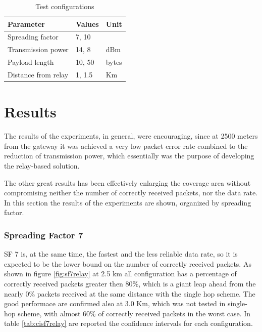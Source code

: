 \begin{table}[]
\centering
\caption{Test configurations}
\label{tab:relay_test}
\begin{tabular}{@{}lll@{}}
\toprule
Parameter           & Values & Unit  \\ \midrule
Spreading factor    & 7, 10  &       \\
Transmission power  & 14, 8  & dBm   \\
Payload length      & 10, 50 & bytes \\
Distance from relay & 1, 1.5 & Km    \\ \bottomrule
\end{tabular}
\end{table}

\section{Results}
The results of the experiments, in general, were encouraging, since at 2500 meters from the gateway it was achieved a very low packet error rate combined to the reduction of transmission power, which essentially was the purpose of developing the relay-based solution.

The other great results has been effectively enlarging the coverage area without compromising neither the number of correctly received packets, nor the data rate. In this section the results of the experiments are shown, organized by spreading factor.

\subsubsection{Spreading Factor 7}

SF 7 is, at the same time, the fastest and the less reliable data rate, so it is expected to be the lower bound on the number of correctly received packets. As shown in figure \ref{fig:sf7relay} at 2.5 km all configuration has a percentage of correctly received packets greater then 80\%,  which is a giant leap ahead from the nearly 0\% packets received at the same distance with the single hop scheme. The good performace are confirmed also at 3.0 Km, which was not tested in single-hop scheme, with almost 60\% of correctly received packets in the worst case. In table \ref{tab:cisf7relay} are reported the confidence intervals for each configuration.

